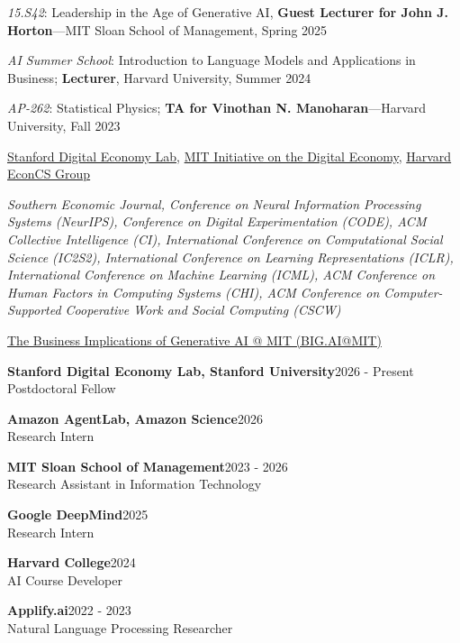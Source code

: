 \documentclass[10pt]{article}
\DeclareRobustCommand{\$}{\char36\relax}  %
\newenvironment{rSection}[1]{%
  \par\addvspace{10pt}%
  \begin{list}{}{%
    \setlength{\leftmargin}{1.4in}\setlength{\labelwidth}{1.3in}%
    \setlength{\labelsep}{0.1in}\setlength{\itemsep}{0pt}%
    \setlength{\topsep}{0pt}\setlength{\parsep}{7pt}%
    \renewcommand{\makelabel}[1]{\smash{\parbox[t]{\labelwidth}{\raggedright\scshape ##1}}}}%
  \item[#1]}{\end{list}}
\newcommand{\entry}[3]{{\bfseries #1}\hspace{1em}\hfill #2\\#3\par}
\begin{document}
\begin{rSection}{Teaching}
\textit{15.S42}: Leadership in the Age of Generative AI, \textbf{Guest Lecturer for John J. Horton}---MIT Sloan School of Management, Spring 2025\par
\textit{AI Summer School}: Introduction to Language Models and Applications in Business; \textbf{Lecturer}, Harvard University, Summer 2024\par
\textit{AP-262}: Statistical Physics; \textbf{TA for Vinothan N. Manoharan}---Harvard University, Fall 2023\par
\end{rSection}

\begin{rSection}{Affiliations}
\href{https://digitaleconomy.stanford.edu/}{Stanford Digital Economy Lab}, \href{https://ide.mit.edu/}{MIT Initiative on the Digital Economy}, \href{https://econcs.seas.harvard.edu/}{Harvard EconCS Group}
\end{rSection}

\begin{rSection}{Review Service}
\textit{Southern Economic Journal, Conference on Neural Information Processing Systems (NeurIPS), Conference on Digital Experimentation (CODE), ACM Collective Intelligence (CI), International Conference on Computational Social Science (IC2S2), International Conference on Learning Representations (ICLR), International Conference on Machine Learning (ICML), ACM Conference on Human Factors in Computing Systems (CHI), ACM Conference on Computer-Supported Cooperative Work and Social Computing (CSCW)}
\end{rSection}

\begin{rSection}{Academic Service}
\href{https://ide.mit.edu/events/2026-the-business-implications-of-generative-ai-mit-big-aimit/}{The Business Implications of Generative AI @ MIT (BIG.AI@MIT)}
\end{rSection}

\begin{rSection}{Employment}
\entry{Stanford Digital Economy Lab, Stanford University}{2026 - Present}{Postdoctoral Fellow}
\entry{Amazon AgentLab, Amazon Science}{2026}{Research Intern}
\entry{MIT Sloan School of Management}{2023 - 2026}{Research Assistant in Information Technology}
\entry{Google DeepMind}{2025}{Research Intern}
\entry{Harvard College}{2024}{AI Course Developer}
\entry{Applify.ai}{2022 - 2023}{Natural Language Processing Researcher}
\end{rSection}
\end{document}
